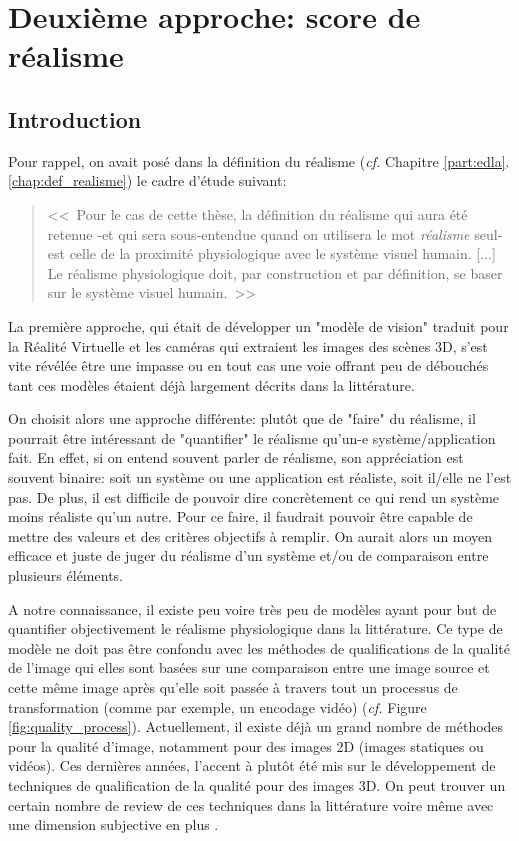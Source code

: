 \part{Deuxième approche: score de réalisme} \newpage
	\chapter*{Introduction}
	\par Pour rappel, on avait posé dans la définition du réalisme (\textit{cf.} Chapitre \ref{part:edla}.\ref{chap:def_realisme}) le cadre d'étude suivant:
	\begin{quote}
		<<~Pour le cas de cette thèse, la définition du réalisme qui aura été retenue -et qui sera sous-entendue quand on utilisera le mot \textit{réalisme} seul- est celle de la proximité physiologique avec le système visuel humain. [...] Le réalisme physiologique doit, par construction et par définition, se baser sur le système visuel humain.~>>
	\end{quote}
	La première approche, qui était de développer un "modèle de vision" traduit pour la Réalité Virtuelle et les caméras qui extraient les images des scènes 3D, s'est vite révélée être une impasse ou en tout cas une voie offrant peu de débouchés tant ces modèles étaient déjà largement décrits dans la littérature.
	
	\par On choisit alors une approche différente: plutôt que de "faire" du réalisme, il pourrait être intéressant de "quantifier" le réalisme qu'un-e système/application fait. En effet, si on entend souvent parler de réalisme, son appréciation est souvent binaire: soit un système ou une application est réaliste, soit il/elle ne l'est pas. De plus, il est difficile de pouvoir dire concrètement ce qui rend un système moins réaliste qu'un autre. Pour ce faire, il faudrait pouvoir être capable de mettre des valeurs et des critères objectifs à remplir. On aurait alors un moyen efficace et juste de juger du réalisme d'un système et/ou de comparaison entre plusieurs éléments.
	
	\par A notre connaissance, il existe peu voire très peu de modèles ayant pour but de quantifier objectivement le réalisme physiologique dans la littérature. Ce type de modèle ne doit pas être confondu avec les méthodes de qualifications de la qualité de l'image qui elles sont basées sur une comparaison entre une image source et cette même image après qu'elle soit passée à travers tout un processus de transformation (comme par exemple, un encodage vidéo) \citep{cadik_human_2004, winkler_quality_2000} (\textit{cf.} Figure \ref{fig:quality_process}). Actuellement, il existe déjà un grand nombre de méthodes pour la qualité d'image, notamment pour des images 2D (images statiques ou vidéos). Ces dernières années, l'accent à plutôt été mis sur le développement de techniques de qualification de la qualité pour des images 3D. On peut trouver un certain nombre de review de ces techniques dans la littérature \citep{moorthy_subjective_2013, moorthy_survey_2013} voire même avec une dimension subjective en plus \citep{beghdadi_survey_2013}.
	

